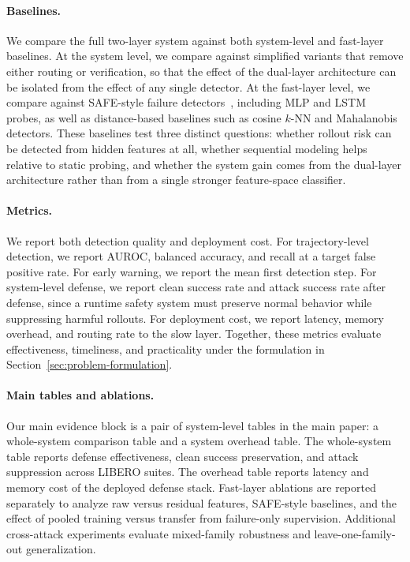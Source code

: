 \paragraph{Baselines.}
We compare the full two-layer system against both system-level and
fast-layer baselines.
At the system level, we compare against simplified variants that remove
either routing or verification, so that the effect of the dual-layer
architecture can be isolated from the effect of any single detector.
At the fast-layer level, we compare against SAFE-style failure
detectors~\citep{safe}, including MLP and LSTM probes, as well as
distance-based baselines such as cosine $k$-NN and Mahalanobis
detectors.
These baselines test three distinct questions:
whether rollout risk can be detected from hidden features at all,
whether sequential modeling helps relative to static probing, and
whether the system gain comes from the dual-layer architecture rather
than from a single stronger feature-space classifier.

\paragraph{Metrics.}
We report both detection quality and deployment cost.
For trajectory-level detection, we report AUROC, balanced accuracy, and
recall at a target false positive rate.
For early warning, we report the mean first detection step.
For system-level defense, we report clean success rate and attack
success rate after defense, since a runtime safety system must preserve
normal behavior while suppressing harmful rollouts.
For deployment cost, we report latency, memory overhead, and routing
rate to the slow layer.
Together, these metrics evaluate effectiveness, timeliness, and
practicality under the formulation in
Section~\ref{sec:problem-formulation}.

\paragraph{Main tables and ablations.}
Our main evidence block is a pair of system-level tables in the main
paper: a whole-system comparison table and a system overhead table.
The whole-system table reports defense effectiveness, clean success
preservation, and attack suppression across LIBERO suites.
The overhead table reports latency and memory cost of the deployed
defense stack.
Fast-layer ablations are reported separately to analyze raw versus
residual features, SAFE-style baselines, and the effect of pooled
training versus transfer from failure-only supervision.
Additional cross-attack experiments evaluate mixed-family robustness
and leave-one-family-out generalization.
